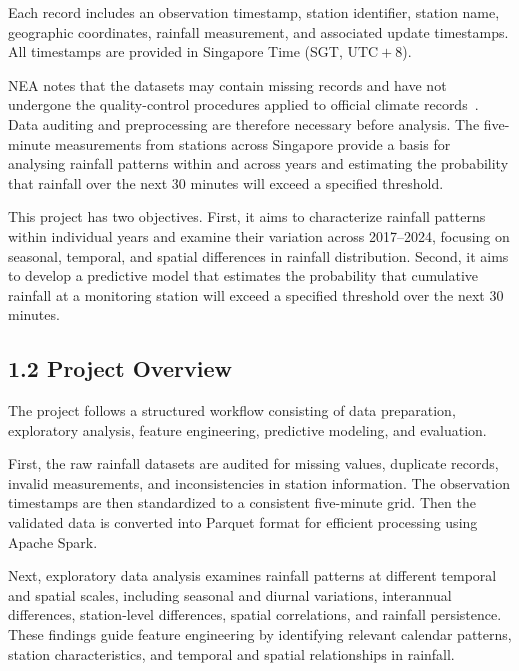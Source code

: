 \documentclass[11pt,a4paper]{article}
\begin{document}
Each record includes an observation timestamp, station identifier, station name, geographic coordinates, rainfall measurement, and associated update timestamps. All timestamps are provided in Singapore Time (SGT, \(\mathrm{UTC}{+}8\)).


NEA notes that the datasets may contain missing records and have not undergone the quality-control procedures applied to official climate records~\citep{nea_rainfall}. Data auditing and preprocessing are therefore necessary before analysis. The five-minute measurements from stations across Singapore provide a basis for analysing rainfall patterns within and across years and estimating the probability that rainfall over the next 30 minutes will exceed a specified threshold.


This project has two objectives. First, it aims to characterize rainfall patterns within individual years and examine their variation across 2017–2024, focusing on seasonal, temporal, and spatial differences in rainfall distribution. Second, it aims to develop a predictive model that estimates the probability that cumulative rainfall at a monitoring station will exceed a specified threshold over the next 30 minutes.


\subsection*{1.2 Project Overview}
{}


The project follows a structured workflow consisting of data preparation, exploratory analysis, feature engineering, predictive modeling, and evaluation.


First, the raw rainfall datasets are audited for missing values, duplicate records, invalid measurements, and inconsistencies in station information. The observation timestamps are then standardized to a consistent five-minute grid. Then the validated data is converted into Parquet format for efficient processing using Apache Spark.


Next, exploratory data analysis examines rainfall patterns at different temporal and spatial scales, including seasonal and diurnal variations, interannual differences, station-level differences, spatial correlations, and rainfall persistence. These findings guide feature engineering by identifying relevant calendar patterns, station characteristics, and temporal and spatial relationships in rainfall.
\end{document}
